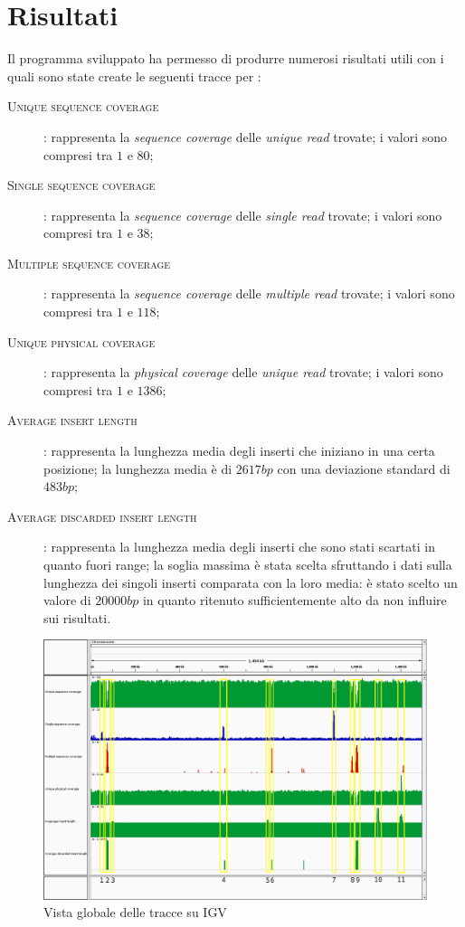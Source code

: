 \section{Risultati}
\label{sec:risultati}
Il programma sviluppato ha permesso di produrre numerosi risultati utili con i quali sono state create le seguenti tracce per :
\begin{description}
\item[\textsc{Unique sequence coverage}]: rappresenta la \emph{sequence coverage} delle \emph{unique read} trovate; i valori sono compresi tra $1$ e $80$;
\item[\textsc{Single sequence coverage}]: rappresenta la \emph{sequence coverage} delle \emph{single read} trovate; i valori sono compresi tra $1$ e $38$;
\item[\textsc{Multiple sequence coverage}]: rappresenta la \emph{sequence coverage} delle \emph{multiple read} trovate; i valori sono compresi tra $1$ e $118$;
\item[\textsc{Unique physical coverage}]: rappresenta la \emph{physical coverage} delle \emph{unique read} trovate; i valori sono compresi tra $1$ e $1386$;
\item[\textsc{Average insert length}]: rappresenta la lunghezza media degli inserti che iniziano in una certa posizione; la lunghezza media è di $2617 bp$ con una deviazione standard di $483 bp$;
\item[\textsc{Average discarded insert length}]: rappresenta la lunghezza media degli inserti che sono stati scartati in quanto fuori range; la soglia massima è stata scelta sfruttando i dati sulla lunghezza dei singoli inserti comparata con la loro media: è stato scelto un valore di $20000 bp$ in quanto ritenuto sufficientemente alto da non influire sui risultati.
\end{description}

\begin{figure}[htbp]
\centering
\includegraphics[width=\textwidth]{immagini/igv_global.png}
\caption{Vista globale delle tracce su IGV}
\label{fig:igv globale}
\end{figure}

